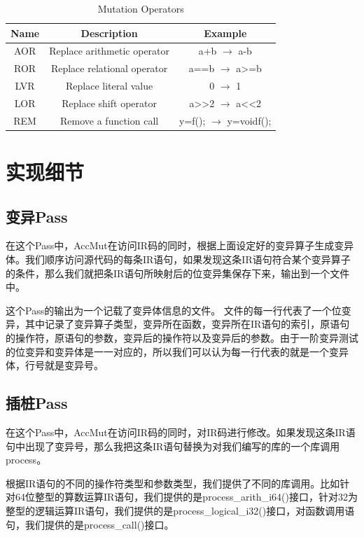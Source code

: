\documentclass[nofonts]{ctexrep}
\begin{document}
\begin{table}[t]
  \centering
  \caption{Mutation Operators}
  \label{tab:operators}
  \begin{tabular}{|c|c|c|}
    \hline
    Name & Description & Example \\
    \hline
    AOR & Replace arithmetic operator & a+b $\rightarrow$ a-b\\
    ROR & Replace relational operator & a==b $\rightarrow$ a>=b\\ 
    LVR & Replace literal value & 0 $\rightarrow$ 1\\
    LOR & Replace shift operator & a>>2 $\rightarrow$ a<<2 \\
    REM & Remove a function call & y=f(); $\rightarrow$ y=voidf(); \\
    \hline
  \end{tabular}
\end{table}



\section{实现细节}
\subsection{变异Pass}
在这个Pass中，AccMut在访问IR码的同时，根据上面设定好的变异算子生成变异体。我们顺序访问源代码的每条IR语句，如果发现这条IR语句符合某个变异算子的条件，那么我们就把条IR语句所映射后的位变异集保存下来，输出到一个文件中。

这个Pass的输出为一个记载了变异体信息的文件。
文件的每一行代表了一个位变异，其中记录了变异算子类型，变异所在函数，变异所在IR语句的索引，原语句的操作符，原语句的参数，变异后的操作符以及变异后的参数。由于一阶变异测试的位变异和变异体是一一对应的，所以我们可以认为每一行代表的就是一个变异体，行号就是变异号。

\subsection{插桩Pass}
在这个Pass中，AccMut在访问IR码的同时，对IR码进行修改。如果发现这条IR语句中出现了变异号，那么我把这条IR语句替换为对我们编写的库的一个库调用process。

根据IR语句的不同的操作符类型和参数类型，我们提供了不同的库调用。比如针对64位整型的算数运算IR语句，我们提供的是process{\_}arith{\_}i64()接口，针对32为整型的逻辑运算IR语句，我们提供的是process{\_}logical{\_}i32()接口，对函数调用语句，我们提供的是process{\_}call()接口。
\end{document}
